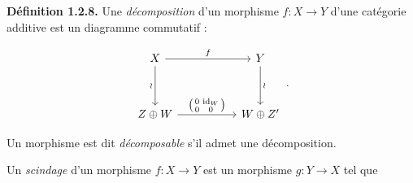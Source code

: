\medskip
\noindent\textbf{Définition 1.2.8.}\quad
Une \emph{décomposition} d'un morphisme $f\colon X\longrightarrow Y$ d'une
catégorie additive est un diagramme commutatif :

\begin{equation*}
  \begin{tikzcd}[ampersand replacement=\&,column sep=5.2em,row sep=3.4em]
    X \arrow[r,"f"] \arrow[d,"\wr"']
      \& Y \arrow[d,"\wr"] \\
    Z\oplus W
      \arrow[r,"{\left(\begin{smallmatrix}0&\operatorname{id}_W\\0&0\end{smallmatrix}\right)}"]
      \& W\oplus Z'
  \end{tikzcd}\,.
\end{equation*}

Un morphisme est dit \emph{décomposable} s'il admet une décomposition.

Un \emph{scindage} d'un morphisme $f\colon X\longrightarrow Y$ est un
morphisme $g\colon Y\longrightarrow X$ tel que
\endgroup
